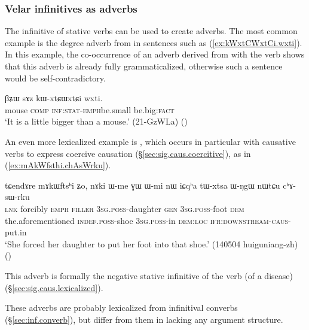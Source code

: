 \subsubsection{Velar infinitives as adverbs}    \label{sec:velar.inf.adverb}
The  infinitive of stative verbs can be used to create adverbs. The most common example is the degree adverb   from  in sentences such as (\ref{ex:kWxtCWxtCi.wxti}). In this example, the co-occurrence of an adverb derived from  with the verb  shows that this adverb is already fully grammaticalized, otherwise such a sentence would be self-contradictory.

\begin{exe}
\ex \label{ex:kWxtCWxtCi.wxti}
 \gll βʑɯ sɤz kɯ-xtɕɯ\redp{}xtɕi wxti. \\
 mouse \textsc{comp} \textsc{inf}:\textsc{stat}-\textsc{emph}\redp{}be.small be.big:\textsc{fact} \\
 \glt `It is a little bigger than a mouse.' (21-GzWLa) ()
\end{exe}

An even more lexicalized example is , which occurs in particular with causative verbs to express coercive causation (§\ref{sec:sig.caus.coercitive}), as in (\ref{ex:mAkWfsthi.chAsWrku}).

\begin{exe}
\ex \label{ex:mAkWfsthi.chAsWrku}
 \gll  tɕendɤre mɤkɯftsʰi ʑo, nɤki ɯ-me ɣɯ ɯ-mi nɯ iɕqʰa tɯ-xtsa ɯ-ŋgɯ nɯtɕu cʰɤ-sɯ-rku  \\
 \textsc{lnk} forcibly \textsc{emph} \textsc{filler} \textsc{3sg}.\textsc{poss}-daughter \textsc{gen}  \textsc{3sg}.\textsc{poss}-foot \textsc{dem} the.aforementioned \textsc{indef}.\textsc{poss}-shoe \textsc{3sg}.\textsc{poss}-in \textsc{dem}:\textsc{loc} \textsc{ifr}:\textsc{downstream}-\textsc{caus}-put.in \\
\glt `She forced her daughter to put her foot into that shoe.' (140504 huiguniang-zh)
()
\end{exe}

This adverb is formally the negative stative infinitive of the verb  (of a disease) (§\ref{sec:sig.caus.lexicalized}).

These adverbs are probably lexicalized from infinitival converbs (§\ref{sec:inf.converb}), but differ from them in lacking any argument structure.
 
